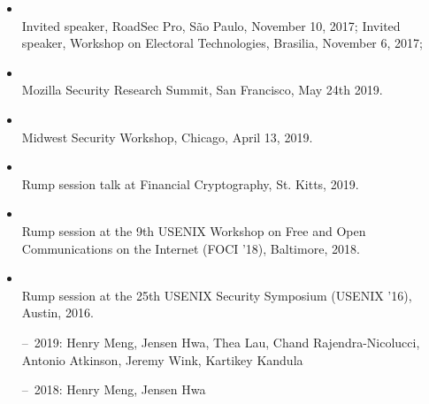 \documentclass[11pt]{article}
\begin{document}
\:
\vspace{-6pt}
\begin{itemize}[label={--\ },leftmargin=0.25in,labelsep=0.1625em]
\addtolength{\itemsep}{-0.4\baselineskip}

\item{}\\
Invited speaker, RoadSec Pro, S\~ao Paulo, November 10, 2017;
Invited speaker, Workshop on Electoral Technologies, Brasilia, November 6, 2017;

\item{}\\
Mozilla Security Research Summit, San Francisco, May 24th 2019.

\item{}\\
Midwest Security Workshop, Chicago, April 13, 2019.

\item{}\\
Rump session talk at Financial Cryptography, St. Kitts, 2019.

\item{}\\
Rump session at the 9th USENIX Workshop on Free and Open Communications on the Internet (FOCI '18), Baltimore, 2018.

\item{}\\
Rump session at the 25th USENIX Security Symposium (USENIX '16), Austin, 2016.

\end{itemize}


\vspace{8pt}

\vspace{-5pt}
\begin{itemize}[label={--\ },leftmargin=0.65in,labelsep=0.325em]
\addtolength{\itemsep}{-0.525\baselineskip}

\item[--\ 2019:] Henry Meng, Jensen Hwa, Thea Lau, Chand Rajendra-Nicolucci, Antonio Atkinson, Jeremy Wink, Kartikey Kandula
\item[--\ 2018:] Henry Meng, Jensen Hwa



\end{itemize}
\end{document}
